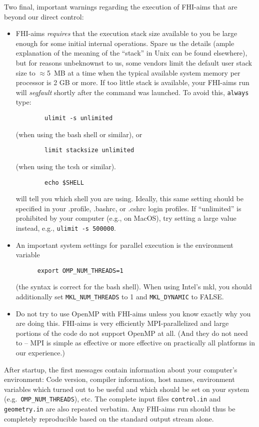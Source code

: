 Two final, important warnings regarding the execution of FHI-aims that are beyond
our direct control:
\begin{itemize}
  \item FHI-aims \emph{requires} that the execution stack size available to
    you be large enough for some initial internal operations. Spare us the
    details (ample explanation of the meaning of the ``stack'' in Unix can be
    found elsewhere), but for reasons unbeknownst to us, some vendors limit
    the default user stack size to $\approx$5~MB at a time when the typical
    available system memory per processor is 2 GB or more. If too little stack is
    available, your FHI-aims run will \emph{segfault} shortly after the
    command was launched. To avoid this, \texttt{always} type:
    \begin{verbatim}
        ulimit -s unlimited
    \end{verbatim}
    (when using the bash shell or similar), or
    \begin{verbatim}
        limit stacksize unlimited
    \end{verbatim}
    (when using the tcsh or similar). 
    \begin{verbatim}
        echo $SHELL
    \end{verbatim}
    will tell you which shell you are using. Ideally, this same setting should
    be specified in your .profile, .bashrc, or .cshrc login profiles. If
    ``unlimited'' is prohibited by your computer (e.g., on MacOS), try
    setting a large value instead, e.g.,
    \texttt{ulimit -s 500000}.
  \item An important system settings for parallel execution is the environment
    variable  
    \begin{verbatim}
      export OMP_NUM_THREADS=1
    \end{verbatim}
    (the syntax is correct for the bash shell). When using Intel's mkl, you
    should additionally set \texttt{MKL\_NUM\_THREADS} to 1 and
    \texttt{MKL\_DYNAMIC} to FALSE.
  \item Do not try to use OpenMP with FHI-aims unless you know exactly
    why you are doing this. FHI-aims is very efficiently
    MPI-parallelized and large portions of the code do not support
    OpenMP at all. (And they do not need to -- MPI is simple as effective
    or more effective on practically all platforms in our experience.)
\end{itemize}

After startup, the first messages contain information about your computer's 
environment: Code version, compiler information, host names, environment 
variables which turned out to be useful and which should be set on
your system (e.g.~\texttt{OMP\_NUM\_THREADS}), etc. The complete input
files \texttt{control.in} and \texttt{geometry.in} are also repeated
verbatim. Any FHI-aims run should thus be completely reproducible
based on the standard output stream alone.

